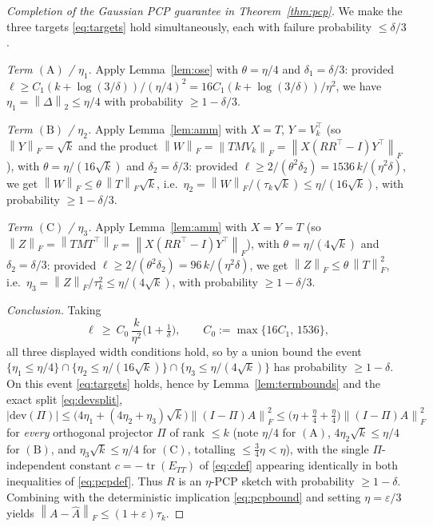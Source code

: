 \documentclass{amsart}
\theoremstyle{definition}
\DeclareMathOperator{\tr}{tr}
\newcommand{\Frob}[1]{\left\lVert #1\right\rVert_F}
\newcommand{\Op}[1]{\left\lVert #1\right\rVert_2}
\begin{document}
\begin{proof}[Completion of the Gaussian PCP guarantee in Theorem~\ref{thm:pcp}]
We make the three targets \eqref{eq:targets} hold simultaneously, each with
failure probability $\le\delta/3$.

\emph{Term $(\mathrm A)$ / $\eta_1$.} Apply Lemma~\ref{lem:ose} with
$\theta=\eta/4$ and $\delta_1=\delta/3$: provided
$\ell\ge C_1(k+\log(3/\delta))/(\eta/4)^2=16C_1(k+\log(3/\delta))/\eta^2$, we have
$\eta_1=\Op\Delta\le\eta/4$ with probability $\ge1-\delta/3$.

\emph{Term $(\mathrm B)$ / $\eta_2$.} Apply Lemma~\ref{lem:amm} with $X=T$,
$Y=V_k^\top$ (so $\Frob Y=\sqrt k$ and the product
$\Frob{W}=\Frob{TMV_k}=\Frob{X(RR^\top-I)Y^\top}$), with $\theta=\eta/(16\sqrt k)$
and $\delta_2=\delta/3$: provided $\ell\ge 2/(\theta^2\delta_2)
=1536\,k/(\eta^2\delta)$, we get $\Frob W\le\theta\,\Frob T\sqrt k$, i.e.\
$\eta_2=\Frob W/(\tau_k\sqrt k)\le\eta/(16\sqrt k)$, with probability
$\ge1-\delta/3$.

\emph{Term $(\mathrm C)$ / $\eta_3$.} Apply Lemma~\ref{lem:amm} with $X=Y=T$ (so
$\Frob Z=\Frob{TMT^\top}=\Frob{X(RR^\top-I)Y^\top}$), with
$\theta=\eta/(4\sqrt k)$ and $\delta_2=\delta/3$: provided
$\ell\ge 2/(\theta^2\delta_2)=96\,k/(\eta^2\delta)$, we get
$\Frob Z\le\theta\,\Frob T^2$, i.e.\ $\eta_3=\Frob Z/\tau_k^2\le\eta/(4\sqrt k)$,
with probability $\ge1-\delta/3$.

\emph{Conclusion.} Taking
\[
\ell\ \ge\ C_0\,\frac{k}{\eta^2}\Big(1+\tfrac1\delta\Big),
\qquad C_0:=\max\{16C_1,\,1536\},
\]
all three displayed width conditions hold, so by a union bound the event
$\{\eta_1\le\eta/4\}\cap\{\eta_2\le\eta/(16\sqrt k)\}\cap\{\eta_3\le\eta/(4\sqrt k)\}$
has probability $\ge1-\delta$. On this event \eqref{eq:targets} holds, hence by
Lemma~\ref{lem:termbounds} and the exact split \eqref{eq:devsplit},
\[
|\mathrm{dev}(\Pi)|\le\big(4\eta_1+(4\eta_2+\eta_3)\sqrt k\big)\Frob{(I-\Pi)A}^2
\le\big(\eta+\tfrac\eta4+\tfrac\eta4\big)\Frob{(I-\Pi)A}^2
\]
for \emph{every} orthogonal projector $\Pi$ of rank $\le k$ (note $\eta/4$ for
$(\mathrm A)$, $4\eta_2\sqrt k\le\eta/4$ for $(\mathrm B)$, and
$\eta_3\sqrt k\le\eta/4$ for $(\mathrm C)$, totalling $\le\tfrac34\eta<\eta$),
with the single $\Pi$-independent constant $c=-\tr(E_{TT})$ of
\eqref{eq:cdef} appearing identically in both inequalities of
\eqref{eq:pcpdef}. Thus $R$ is an $\eta$-PCP sketch with probability $\ge1-\delta$.
Combining with the deterministic implication \eqref{eq:pcpbound} and setting
$\eta=\varepsilon/3$ yields $\Frob{A-\widehat A}\le(1+\varepsilon)\tau_k$.


\end{proof}
\end{document}
